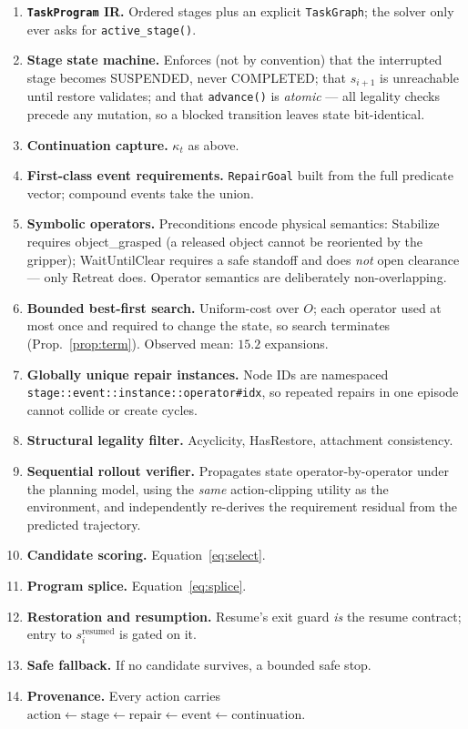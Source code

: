 \documentclass[11pt]{article}
\begin{document}
\begin{enumerate}[leftmargin=2em,itemsep=1pt]
\item \textbf{\texttt{TaskProgram} IR.} Ordered stages plus an explicit
      \texttt{TaskGraph}; the solver only ever asks for \texttt{active\_stage()}.
\item \textbf{Stage state machine.} Enforces (not by convention) that the
      interrupted stage becomes \textsf{SUSPENDED}, never \textsf{COMPLETED};
      that $s_{i+1}$ is unreachable until restore validates; and that
      \texttt{advance()} is \emph{atomic} --- all legality checks precede any
      mutation, so a blocked transition leaves state bit-identical.
\item \textbf{Continuation capture.} $\kappa_t$ as above.
\item \textbf{First-class event requirements.} \texttt{RepairGoal} built from the
      full predicate vector; compound events take the union.
\item \textbf{Symbolic operators.} Preconditions encode physical semantics:
      \textsf{Stabilize} requires \textsf{object\_grasped} (a released object
      cannot be reoriented by the gripper); \textsf{WaitUntilClear} requires a
      safe standoff and does \emph{not} open clearance --- only \textsf{Retreat}
      does. Operator semantics are deliberately non-overlapping.
\item \textbf{Bounded best-first search.} Uniform-cost over $O$; each operator
      used at most once and required to change the state, so search terminates
      (Prop.~\ref{prop:term}). Observed mean: $15.2$ expansions.
\item \textbf{Globally unique repair instances.} Node IDs are namespaced
      \texttt{stage::event::instance::operator\#idx}, so repeated repairs in one
      episode cannot collide or create cycles.
\item \textbf{Structural legality filter.} Acyclicity, \textsf{HasRestore},
      attachment consistency.
\item \textbf{Sequential rollout verifier.} Propagates state
      operator-by-operator under the planning model, using the \emph{same}
      action-clipping utility as the environment, and independently re-derives
      the requirement residual from the predicted trajectory.
\item \textbf{Candidate scoring.} Equation~\eqref{eq:select}.
\item \textbf{Program splice.} Equation~\eqref{eq:splice}.
\item \textbf{Restoration and resumption.} \textsf{Resume}'s exit guard
      \emph{is} the resume contract; entry to $s_i^{\mathrm{resumed}}$ is gated
      on it.
\item \textbf{Safe fallback.} If no candidate survives, a bounded safe stop.
\item \textbf{Provenance.} Every action carries
      $\text{action}\!\leftarrow\!\text{stage}\!\leftarrow\!\text{repair}
      \!\leftarrow\!\text{event}\!\leftarrow\!\text{continuation}$.
\end{enumerate}
\end{document}
